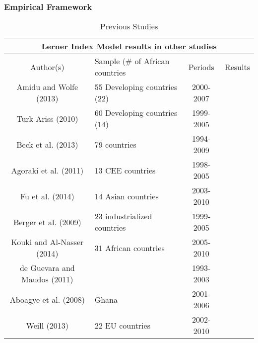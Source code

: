 \documentclass[11pt]{beamer}
\numberwithin{equation}{section}
\begin{document}
\begin{frame}
\frametitle{Empirical Framework}
\begin{table}
\caption{Previous Studies}
\tiny
\begin{tabular}{clcl}
\toprule
\multicolumn{4}{c}{Lerner Index Model results in other studies}\\
\midrule
Author(s)   &   Sample (\# of African countries &   Periods &   Results \\
\midrule
Amidu and Wolfe (2013)  &   55 Developing countries (22)    &   2000-2007   &       \\
Turk Ariss (2010)   &   60 Developing countries (14)    &   1999-2005   &       \\
Beck et al. (2013)  &   79 countries    &   1994-2009   &       \\
Agoraki et al. (2011)   &   13 CEE countries    &   1998-2005   &       \\
Fu et al. (2014)    &   14 Asian countries  &   2003-2010   &       \\
Berger et al. (2009)    &   23 industrialized countries     &   1999-2005   &       \\
Kouki and Al-Nasser (2014)  &   31 African countries    &   2005-2010   &       \\
de Guevara and Maudos (2011)    &       &   1993-2003   &       \\
Aboagye et al. (2008)   &   Ghana   &   2001-2006   &       \\
Weill (2013)    &   22 EU countries &   2002-2010   &       \\
\bottomrule
\end{tabular}
\end{table}
\end{frame}
\end{document}
